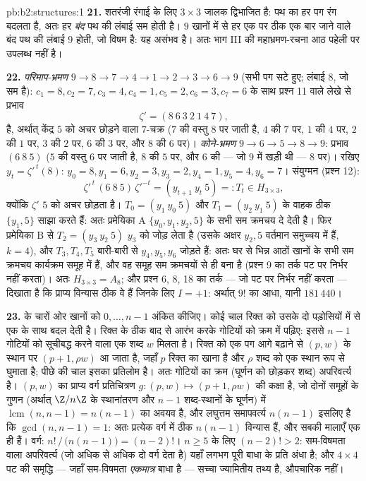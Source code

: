 \begin{solution}{pb:b2:structures:1}
\textbf{21.} शतरंजी रंगाई के लिए $3 \times 3$ जालक द्विभाजित है: पथ का हर पग
रंग बदलता है, अतः हर \emph{बंद} पथ की लंबाई सम होती है। $9$ खानों में
से हर एक पर ठीक एक बार जाने वाले बंद पथ की लंबाई $9$ होती, जो विषम
है: यह असंभव है। अतः भाग III की महाभ्रमण-रचना आठ पहेली पर उपलब्ध नहीं
है।

\textbf{22.} \emph{परिमाप-भ्रमण} $9 \to 8 \to 7 \to 4 \to 1
\to 2 \to 3 \to 6 \to 9$ (सभी पग सटे हुए; लंबाई $8$, जो
सम है): $c_1 = 8, c_2 = 7, c_3 =
4, c_4 = 1, c_5 = 2, c_6 = 3, c_7 = 6$ के साथ प्रश्न 11 वाले लेखे से प्रभाव
\[
\zeta' = (8\ 6\ 3\ 2\ 1\ 4\ 7),
\]
है, अर्थात् केंद्र $5$ को अचर छोड़ने वाला $7$-चक्र ($7$ की वस्तु $8$
पर जाती है, $4$ की $7$ पर, $1$ की $4$ पर, $2$ की $1$ पर, $3$ की
$2$ पर, $6$ की $3$ पर, और $8$ की $6$ पर)। \emph{कोने-भ्रमण}
$9 \to 6 \to
5 \to 8 \to 9$: प्रभाव $(6\ 8\ 5)$ ($5$ की वस्तु $6$ पर जाती है, $8$ की $5$ पर,
और $6$ की --- जो $9$ में खड़ी थी --- $8$ पर)। रखिए $y_t = \zeta'^{\,t}(8)$: $y_0 = 8, y_1 = 6, y_2 = 3, y_3 = 2,
y_4 = 1, y_5 = 4, y_6 = 7$।
संयुग्मन (प्रश्न 12):
\[
\zeta'^{\,t}\,(6\ 8\ 5)\,\zeta'^{-t}
= (y_{t+1}\ y_t\ 5) =: T_t \in H_{3\times3},
\]
क्योंकि $\zeta'$ $5$ को अचर छोड़ता है। $T_0 = (y_1\ y_0\ 5)$ और $T_1 = (y_2\ y_1\ 5)$ के वाहक ठीक $\{y_1, 5\}$
साझा करते हैं: अतः प्रमेयिका A $\{y_0, y_1, y_2, 5\}$ के सभी सम क्रमचय दे देती है। फिर
प्रमेयिका B से $T_2 = (y_3\ y_2\ 5)$ $y_3$ को जोड़ लेता है (उसके अक्षर $y_2, 5$ वर्तमान
समुच्चय में हैं, $k = 4$), और $T_3, T_4, T_5$ बारी-बारी से $y_4, y_5, y_6$ जोड़ते हैं: अतः घर
से भिन्न आठों खानों के सभी सम क्रमचय कार्यक्रम समूह में हैं, और वह
समूह सम क्रमचयों से ही बना है (प्रश्न 9 का तर्क पट पर निर्भर नहीं
करता)। अतः $H_{3\times3} = A_8$; और प्रश्न 6, 8, 18 का तर्क --- जो पट पर निर्भर नहीं
करता --- दिखाता है कि प्राप्य विन्यास ठीक वे हैं जिनके लिए $I = +1$:
अर्थात् $9!$ का आधा, यानी $181\,440$।

\textbf{23.}  के चारों ओर खानों को $0, \dots, n-1$ अंकित कीजिए। कोई चाल रिक्त
को उसके दो पड़ोसियों में से एक के साथ बदल देती है। रिक्त के ठीक बाद से
आरंभ करके गोटियों को  क्रम में पढ़िए: इससे $n - 1$ गोटियों को
सूचीबद्ध करने वाला एक शब्द $w$ मिलता है। रिक्त को एक पग आगे बढ़ाने से
$(p, w)$ के स्थान पर $(p + 1, \rho w)$ आ जाता है, जहाँ $p$ रिक्त का खाना है और $\rho$ शब्द
को एक स्थान  रूप से घुमाता है; पीछे की चाल इसका प्रतिलोम है।
अतः गोटियों का \emph{} क्रम (घूर्णन को छोड़कर शब्द) अपरिवर्त्य
है। $(p, w)$ का प्राप्य वर्ग प्रतिचित्रण $g \colon (p, w) \mapsto (p+1,
\rho w)$ की कक्षा है, जो दोनों 
समूहों के गुणन (अर्थात् $\Z/n\Z$ के स्थानांतरण और $n-1$ शब्द-स्थानों के
घूर्णन) में  $\operatorname{lcm}(n, n-1) =
n(n-1)$ का अवयव है, और लघुत्तम समापवर्त्य $n(n-1)$ इसलिए है
कि $\gcd(n, n-1) = 1$: अतः प्रत्येक वर्ग में ठीक $n(n-1)$ विन्यास हैं, और सबकी मालाएँ
एक ही हैं। वर्ग: $n!\,/\,\bigl(n(n-1)\bigr) = (n-2)!$। $n \geq 5$ के लिए $(n-2)! > 2$: सम-विषमता वाला अपरिवर्त्य
(जो अधिक से अधिक दो वर्ग देता है) यहाँ लगभग पूरी बाधा के प्रति अंधा
है; और $4
\times 4$ पट की समृद्धि --- जहाँ सम-विषमता \emph{एकमात्र} बाधा है
--- सच्चा ज्यामितीय तथ्य है, औपचारिक नहीं।


\end{solution}
